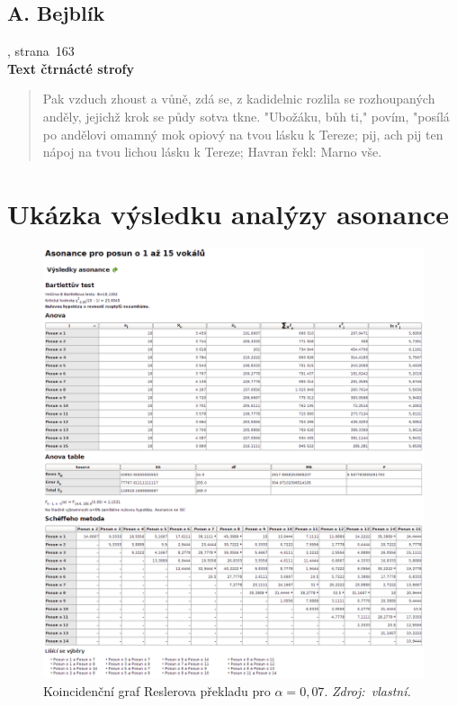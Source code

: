 \documentclass[dp.tex]{subfiles}
\begin{document}
\section*{A. Bejblík}
, strana~163
\\\textbf{Text čtrnácté strofy}
\begin{verse}
Pak vzduch zhoust a vůně, zdá se, z kadidelnic rozlila se
rozhoupaných anděly, jejichž krok se půdy sotva tkne.
"Ubožáku, bůh ti," povím, "posílá po andělovi
omamný mok opiový na tvou lásku k Tereze;
pij, ach pij ten nápoj na tvou lichou lásku k Tereze;
Havran řekl: Marno vše.
\end{verse}

\chapter{Ukázka výsledku analýzy asonance}
\label{appendix:asonance}
\begin{figure}[H]
	\centering
	\includegraphics[max width=\textwidth,keepaspectratio=true]{imgs-70-prakticka/assonance}
	\caption[Koincidenční graf Reslerova překladu pro $\alpha = 0{,}07$.]{Koincidenční graf Reslerova překladu pro $\alpha = 0{,}07$. \textit{Zdroj:~vlastní.}}
	\label{fig:denotation-resler-007}
\end{figure}
\end{document}
